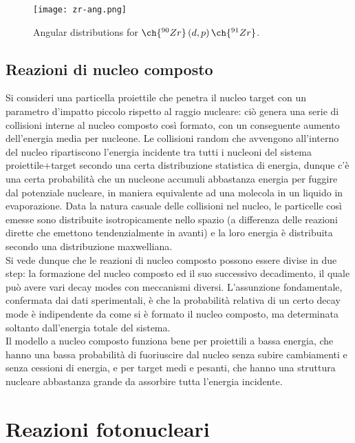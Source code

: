 \begin{figure}[H]
	\centering
	\texttt{[image: zr-ang.png]}
	\caption{Angular distributions for $ \ch{^{90}Zr} \left( d,p \right) \ch{^{91}Zr} $.}
	\label{zr-ang}
\end{figure}

\subsection{Reazioni di nucleo composto}

Si consideri una particella proiettile che penetra il nucleo target con un parametro d'impatto piccolo rispetto al raggio nucleare: ciò genera una serie di collisioni interne al nucleo composto così formato, con un conseguente aumento dell'energia media per nucleone. Le collisioni random che avvengono all'interno del nucleo ripartiscono l'energia incidente tra tutti i nucleoni del sistema proiettile+target secondo una certa distribuzione statistica di energia, dunque c'è una certa probabilità che un nucleone accumuli abbastanza energia per fuggire dal potenziale nucleare, in maniera equivalente ad una molecola in un liquido in evaporazione. Data la natura casuale delle collisioni nel nucleo, le particelle così emesse sono distribuite isotropicamente nello spazio (a differenza delle reazioni dirette che emettono tendenzialmente in avanti) e la loro energia è distribuita secondo una distribuzione maxwelliana.\\
Si vede dunque che le reazioni di nucleo composto possono essere divise in due step: la formazione del nucleo composto ed il suo successivo decadimento, il quale può avere vari decay modes con meccanismi diversi. L'assunzione fondamentale, confermata dai dati sperimentali, è che la probabilità relativa di un certo decay mode è indipendente da come si è formato il nucleo composto, ma determinata soltanto dall'energia totale del sistema.\\
Il modello a nucleo composto funziona bene per proiettili a bassa energia, che hanno una bassa probabilità di fuoriuscire dal nucleo senza subire cambiamenti e senza cessioni di energia, e per target medi e pesanti, che hanno una struttura nucleare abbastanza grande da assorbire tutta l'energia incidente.

\section{Reazioni fotonucleari}

